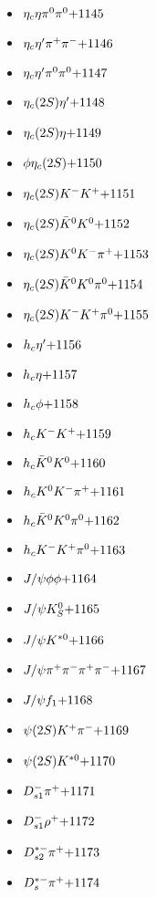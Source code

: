 \begin{multicols}{3}
\begin{itemize}
 \item $ \eta_{c} \eta \pi^{0} \pi^{0} \hfill{+1145}$
 \item $ \eta_{c} {\eta^{\prime}} \pi^{+} \pi^{-} \hfill{+1146}$
 \item $ \eta_{c} {\eta^{\prime}} \pi^{0} \pi^{0} \hfill{+1147}$
 \item $ \eta_{c}(2S) {\eta^{\prime}} \hfill{+1148}$
 \item $ \eta_{c}(2S) \eta \hfill{+1149}$
 \item $ \phi \eta_{c}(2S) \hfill{+1150}$
 \item $ \eta_{c}(2S) K^{-} K^{+} \hfill{+1151}$
 \item $ \eta_{c}(2S) \bar{K}^{0} K^{0} \hfill{+1152}$
 \item $ \eta_{c}(2S) K^{0} K^{-} \pi^{+} \hfill{+1153}$
 \item $ \eta_{c}(2S) \bar{K}^{0} K^{0} \pi^{0} \hfill{+1154}$
 \item $ \eta_{c}(2S) K^{-} K^{+} \pi^{0} \hfill{+1155}$
 \item $ h_{c} {\eta^{\prime}} \hfill{+1156}$
 \item $ h_{c} \eta \hfill{+1157}$
 \item $ h_{c} \phi \hfill{+1158}$
 \item $ h_{c} K^{-} K^{+} \hfill{+1159}$
 \item $ h_{c} \bar{K}^{0} K^{0} \hfill{+1160}$
 \item $ h_{c} K^{0} K^{-} \pi^{+} \hfill{+1161}$
 \item $ h_{c} \bar{K}^{0} K^{0} \pi^{0} \hfill{+1162}$
 \item $ h_{c} K^{-} K^{+} \pi^{0} \hfill{+1163}$
 \item $ J/\psi \phi \phi \hfill{+1164}$
 \item $ J/\psi K_{S}^{0} \hfill{+1165}$
 \item $ J/\psi K^{*0} \hfill{+1166}$
 \item $ J/\psi \pi^{+} \pi^{-} \pi^{+} \pi^{-} \hfill{+1167}$
 \item $ J/\psi f_{1} \hfill{+1168}$
 \item $ \psi(2S) K^{+} \pi^{-} \hfill{+1169}$
 \item $ \psi(2S) K^{*0} \hfill{+1170}$
 \item $ D_{s1}^{-} \pi^{+} \hfill{+1171}$
 \item $ D_{s1}^{-} \rho^{+} \hfill{+1172}$
 \item $ D_{s2}^{*-} \pi^{+} \hfill{+1173}$
 \item $ D_{s}^{*-} \pi^{+} \hfill{+1174}$

\end{itemize}
\end{multicols}
